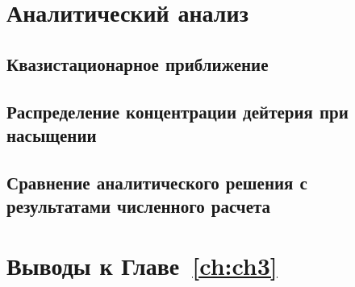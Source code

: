 \section{Аналитический анализ}\label{sec:ch3/sec3}
\subsection{Квазистационарное приближение}\label{sec:ch3/sec3/subsec1}
\subsection{Распределение концентрации дейтерия при насыщении}\label{sec:ch3/sec3/subsec2}
\subsection{Сравнение аналитического решения с результатами численного расчета}\label{sec:ch3/sec3/subsec3}

\section{Выводы к Главе~\ref{ch:ch3}}

\clearpage
